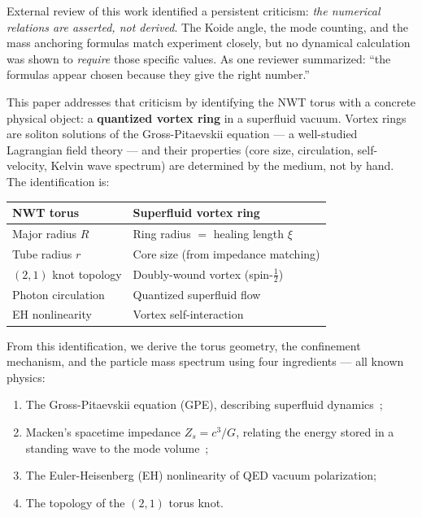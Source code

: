 \documentclass[11pt,a4paper]{article}
\begin{document}
External review of this work identified a persistent criticism:
\emph{the numerical relations are asserted, not derived}.  The Koide
angle, the mode counting, and the mass anchoring formulas match
experiment closely, but no dynamical calculation was shown to
\emph{require} those specific values.  As one reviewer summarized:
``the formulas appear chosen because they give the right number.''

This paper addresses that criticism by identifying the NWT torus with
a concrete physical object: a \textbf{quantized vortex ring} in a
superfluid vacuum.  Vortex rings are soliton solutions of the
Gross-Pitaevskii equation --- a well-studied Lagrangian field theory
--- and their properties (core size, circulation, self-velocity, Kelvin
wave spectrum) are determined by the medium, not by hand.  The
identification is:
\begin{center}
\begin{tabular}{ll}
\toprule
NWT torus & Superfluid vortex ring \\
\midrule
Major radius $R$ & Ring radius $=$ healing length $\xi$ \\
Tube radius $r$ & Core size (from impedance matching) \\
$(2,1)$ knot topology & Doubly-wound vortex (spin-$\tfrac{1}{2}$) \\
Photon circulation & Quantized superfluid flow \\
EH nonlinearity & Vortex self-interaction \\
\bottomrule
\end{tabular}
\end{center}

From this identification, we derive the torus geometry, the
confinement mechanism, and the particle mass spectrum using four
ingredients --- all known physics:
\begin{enumerate}
\item The Gross-Pitaevskii equation (GPE), describing superfluid
  dynamics~\cite{irvine2008};
\item Macken's spacetime impedance $Z_s = c^3/G$, relating the
  energy stored in a standing wave to the mode volume~\cite{macken};
\item The Euler-Heisenberg (EH) nonlinearity of QED vacuum polarization;
\item The topology of the $(2,1)$ torus knot.
\end{enumerate}


\end{document}
